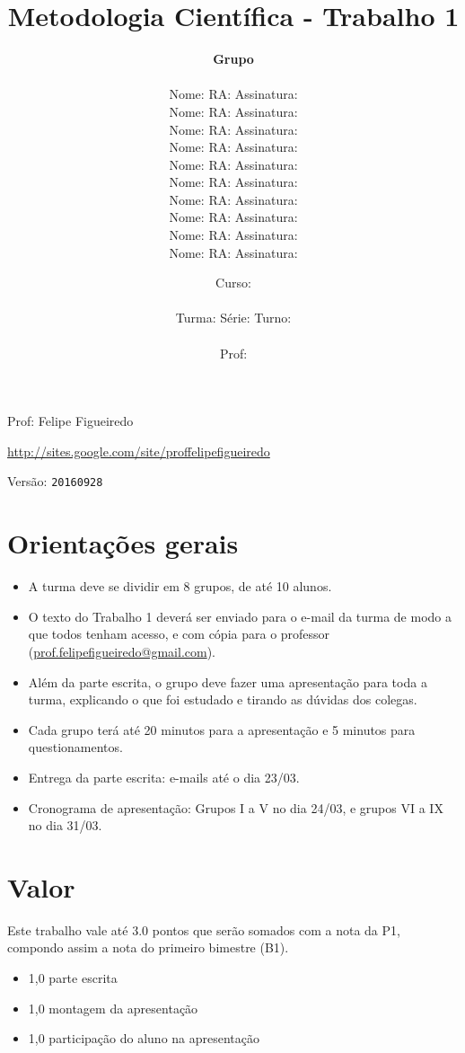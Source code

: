 \documentclass[a4paper]{article}
\date{
\bigskip
Curso: \underline{\hspace{8cm}}\\
\ \\
Turma: \underline{\hspace{1cm}} Série: \underline{\hspace{1cm}} Turno:
\underline{\hspace{1cm}}\\
\ \\
Prof: \underline{\hspace{8cm}}\\
}
\title{Metodologia Científica - Trabalho 1}
\author{
{\bf Grupo} \underline{\hspace{1cm}}\\
\ \\
Nome: \underline{\hspace{6cm}} RA: \underline{\hspace{2cm}} Assinatura: \underline{\hspace{4cm}}\\
Nome: \underline{\hspace{6cm}} RA: \underline{\hspace{2cm}} Assinatura: \underline{\hspace{4cm}}\\
Nome: \underline{\hspace{6cm}} RA: \underline{\hspace{2cm}} Assinatura: \underline{\hspace{4cm}}\\
Nome: \underline{\hspace{6cm}} RA: \underline{\hspace{2cm}} Assinatura: \underline{\hspace{4cm}}\\
Nome: \underline{\hspace{6cm}} RA: \underline{\hspace{2cm}} Assinatura: \underline{\hspace{4cm}}\\
Nome: \underline{\hspace{6cm}} RA: \underline{\hspace{2cm}} Assinatura: \underline{\hspace{4cm}}\\
Nome: \underline{\hspace{6cm}} RA: \underline{\hspace{2cm}} Assinatura: \underline{\hspace{4cm}}\\
Nome: \underline{\hspace{6cm}} RA: \underline{\hspace{2cm}} Assinatura: \underline{\hspace{4cm}}\\
Nome: \underline{\hspace{6cm}} RA: \underline{\hspace{2cm}} Assinatura: \underline{\hspace{4cm}}\\
Nome: \underline{\hspace{6cm}} RA: \underline{\hspace{2cm}} Assinatura: \underline{\hspace{4cm}}\\
}
\begin{document}
\newpage

\parbox[c]{.825\textwidth}{\raggedright%
{Prof: Felipe Figueiredo\par}
{\url{http://sites.google.com/site/proffelipefigueiredo}\par}
}

Versão: \verb|20160928|





\section{Orientações gerais}

\begin{itemize}
\item A turma deve se dividir em 8 grupos, de até 10 alunos.
\item O texto do Trabalho 1 deverá ser enviado para o e-mail da turma de modo a que todos tenham acesso, e com cópia para o professor (\url{prof.felipefigueiredo@gmail.com}).
\item Além da parte escrita, o grupo deve fazer uma apresentação para toda a turma, explicando o que foi estudado e tirando as dúvidas dos colegas.
\item Cada grupo terá até 20 minutos para a apresentação e 5 minutos para questionamentos.
\item Entrega da parte escrita: e-mails até o dia 23/03.
\item Cronograma de apresentação: Grupos I a V no dia 24/03, e grupos VI a IX no dia 31/03.
\end{itemize}

\section{Valor}
Este trabalho vale até $3.0$ pontos que serão somados com a nota da P1, compondo assim a nota do primeiro bimestre (B1).

\begin{itemize}
\item 1,0 parte escrita
\item 1,0 montagem da apresentação
\item 1,0 participação do aluno na apresentação
\end{itemize}
\end{document}
